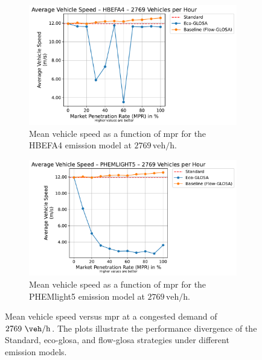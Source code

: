 \begin{figure}[htbp]
  \centering
  \begin{subfigure}[b]{0.98\textwidth}
    \includegraphics[width=\textwidth]{data/img/AverageVehicleSpeed/AverageVehicleSpeed_HBEFA4_Cars2769.pdf}
    \caption{Mean vehicle speed as a function of \ac{mpr} for the HBEFA4 emission model at $2769\,\mathrm{veh/h}$.}
    \label{fig:MeanSpeed_HBEFA4_2769}
  \end{subfigure}
  \begin{subfigure}[b]{0.98\textwidth}
    \includegraphics[width=\textwidth]{data/img/AverageVehicleSpeed/AverageVehicleSpeed_PHEMLIGHT5_Cars2769.pdf}
    \caption{Mean vehicle speed as a function of \ac{mpr} for the PHEMlight5 emission model at $2769\,\mathrm{veh/h}$.}
    \label{fig:MeanSpeed_PHEM_2769}
  \end{subfigure}
  \caption[Mean vehicle speed vs. \ac{mpr} at $2769~\unit{\veh\per\hour}$]{Mean vehicle speed versus \ac{mpr} at a congested demand of $2769~\unit{\veh\per\hour}$. The plots illustrate the performance divergence of the Standard, \ac{eco-glosa}, and \ac{flow-glosa} strategies under different emission models.}
\label{fig:MeanSpeed_2769}
\end{figure}

